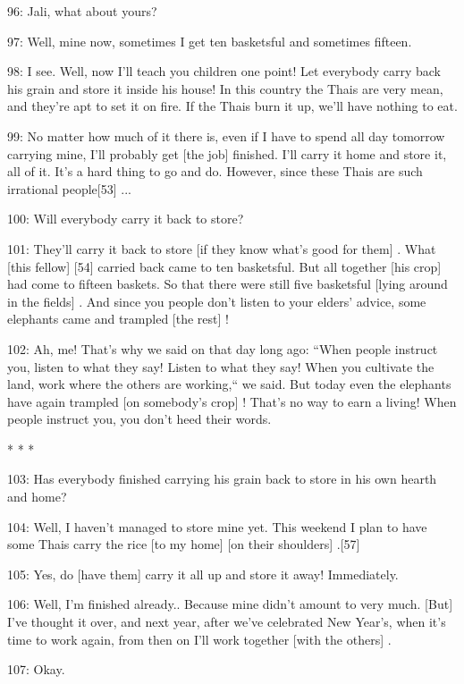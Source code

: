 96: Jali, what about yours?

97: Well, mine now, sometimes I get ten basketsful and sometimes fifteen.

98: I see. Well, now  I'll teach you children one point! Let everybody carry back
his grain and store it inside his house! In this country the Thais are very mean,
and they're apt to set it on fire. If the Thais burn it up, we'll have nothing
to eat.

99: No matter how much of it there is, even if I have to spend all day tomorrow
carrying mine, I'll probably get [the job]  finished. I'll carry it home and store
it, all of it. It's a hard thing  to go and do. However, since these Thais are
such irrational people[53] ...

100: Will everybody carry it back to store?

101: They'll carry it back to store [if they know what's good for them] . What
[this fellow] [54]  carried back came to ten basketsful. But all together [his
crop]  had come to fifteen baskets. So that there were still five basketsful [lying
around in the fields] . And since you people don't listen to your elders' advice,
some elephants came and trampled [the rest] !

102: Ah, me! That's why we said on that day long ago: ``When people instruct
you, listen to what they say! Listen to what they say! When you cultivate the land,
work where the others are working,`` we said. But today even the elephants
have again trampled [on somebody's crop] ! That's no way to earn a living! When
people instruct you, you don't heed their words.

\begin{center}
* * *
\end{center}

\leftskip=0pt
103: Has everybody finished carrying his grain back to store in his own hearth
and home?

104: Well, I haven't managed to store mine yet. This weekend I plan to have some
Thais carry the rice [to my home]  [on their shoulders] .[57]

105: Yes, do [have them]  carry it all up and store it away! Immediately.

106: Well, I'm finished already.. Because mine didn't amount to very much. [But]
I've thought it over, and next year, after we've celebrated New Year's, when it's
time to work again, from then on I'll work together [with the others] .

107: Okay.

